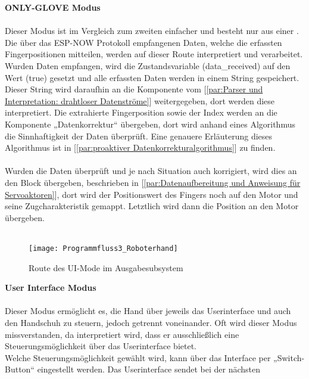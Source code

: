 \documentclass[titlepage,12pt,twoside]{article}
\begin{document}
\hfill \break
\textbf{ONLY-GLOVE Modus} \\
\\
Dieser Modus ist im Vergleich zum zweiten einfacher und besteht nur aus einer . Die über das ESP-NOW Protokoll empfangenen Daten, welche 
die erfassten Fingerpositionen mitteilen, werden auf dieser Route interpretiert und verarbeitet. \\
Wurden Daten empfangen, wird die Zustandsvariable (data\_received) auf den Wert (true) gesetzt und alle erfassten Daten werden in einem String gespeichert. 
Dieser String wird daraufhin an die Komponente  vom [\textcolor{blue}{\autoref{par:Parser und Interpretation: drahtloser Datenströme}}] weitergegeben, 
dort werden diese interpretiert. Die extrahierte Fingerposition sowie der Index werden an die Komponente „Datenkorrektur“ übergeben, dort wird anhand 
eines Algorithmus die Sinnhaftigkeit der Daten überprüft. Eine genauere Erläuterung dieses Algorithmus ist in [\textcolor{blue}{\autoref{par:proaktiver Datenkorrekturalgorithmus}}]
zu finden. \\
\\
\hfill \break
Wurden die Daten überprüft und je nach Situation auch korrigiert, wird dies an den Block  übergeben, beschrieben in 
[\textcolor{blue}{\autoref{par:Datenaufbereitung und Anweisung für Servoaktoren}}], dort wird der Positionswert des Fingers noch auf den Motor und seine Zugcharakteristik 
gemappt. Letztlich wird dann die Position an den Motor übergeben. \\
\\
\begin{figure}[H]
	\begin{center}
		\scalebox{0.9}
		{\texttt{[image: Programmfluss3\_Roboterhand]}}
		\caption{Route des UI-Mode im Ausgabesubsystem}
		\label{fig:Programmfluss3_Roboterhand}		
	\end{center}
\end{figure}
\hfill \break
\textbf{User Interface Modus} \\
\\
Dieser Modus ermöglicht es, die Hand über jeweils das Userinterface und auch den Handschuh zu steuern, jedoch getrennt voneinander. Oft wird dieser Modus 
missverstanden, da interpretiert wird, dass er ausschließlich eine Steuerungsmöglichkeit über das Userinterface bietet. \\
Welche Steuerungsmöglichkeit gewählt wird, kann über das Interface per „Switch-Button“ eingestellt werden. Das Userinterface sendet bei der nächsten 
\end{document}
